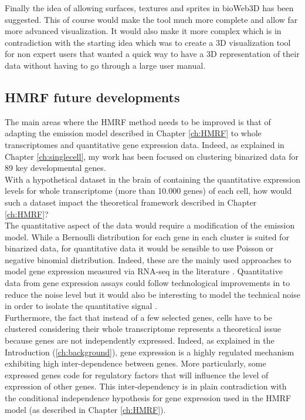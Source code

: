    Finally the idea of allowing surfaces, textures and sprites in bioWeb3D has been suggested. This of course would make the tool much more complete and allow far more advanced visualization. It would also make it more complex which is in contradiction with the starting idea which was to create a 3D visualization tool for non expert users that wanted a quick way to have a 3D representation of their data without having to go through a large user manual.
  
  
  \subsection{HMRF future developments}
  The main areas where the HMRF method needs to be improved is that of adapting the emission model described in Chapter \ref{ch:HMRF} to whole transcriptomes and quantitative gene expression data. Indeed, as explained in Chapter \ref{ch:singlecell}, my work has been focused on clustering binarized data for 89 key developmental genes.\\
  
  With a hypothetical dataset in the brain of \platy{} containing the quantitative expression levels for whole transcriptome (more than 10.000 genes) of each cell, how would such a dataset impact the theoretical framework described in Chapter \ref{ch:HMRF}?\\
  
  The quantitative aspect of the data would require a modification of the emission model. While a Bernoulli distribution for each gene in each cluster is suited for binarized data, for quantitative data it would be sensible to use Poisson or negative binomial distribution. Indeed, these are the mainly used approaches to model gene expression measured via RNA-seq in the literature \citep{marioni08,anders10}.  Quantitative data from gene expression assays could follow technological improvements in to reduce the noise level but it would also be interesting to model the technical noise in order to isolate the quantitative signal \citep{brennecke13}.\\
  
  Furthermore, the fact that instead of a few selected genes, cells have to be clustered considering their whole transcriptome represents a theoretical issue because genes are not independently expressed. Indeed, as explained in the Introduction (\ref{ch:background}), gene expression is a highly regulated mechanism exhibiting high inter-dependence between genes. More particularly, some expressed genes code for regulatory factors that will influence the level of expression of other genes. This inter-dependency is in plain contradiction with the conditional independence hypothesis for gene expression used in the HMRF model (as described in Chapter \ref{ch:HMRF}).\\
  
